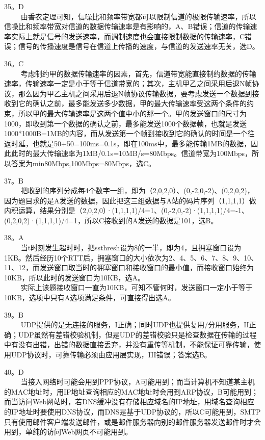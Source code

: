 35。D \\
$\qquad$ 由香农定理可知，信噪比和频率带宽都可以限制信道的极限传输速率，所以信噪比和频率带宽对信道的数据传输速率是有影响的，A、B错误；信道的传输速率实际上就是信号的发送速率，而调制速度也会直接限制数据的传输速率，C错误；信号的传播速度是信号在信道上传播的速度，与信道的发送速率无关，选D。

36。C \\
$\qquad$ 考虑制约甲的数据传输速率的因素，首先，信道带宽能直接制约数据的传输速率，传输速率一定是小于等于信道带宽的；其次，主机甲乙之间采用后退N帧协议，那么因为甲乙主机之间采用后退N帧协议传输数据，要考虑发送一个数据到接收到它的确认之前，最多能发送多少数据，甲的最大传输速率受这两个条件的约束，所以甲的最大传输速率是这两个值中小的那一个。甲的发送窗口的尺寸为1000，即收到第一个数据的确认之前，最多能发送1000个数据帧，也就是发送1000*1000B=1MB的内容，而从发送第一个帧到接收到它的确认的时间是一个往返时延，也就是50+50=100ms=0.1s，即在100ms中，最多能传输1MB的数据，因此此时的最大传输速率为1MB/0.1s=10MB/s=80Mbps。信道带宽为100Mbps，所以答案为min{80Mbps,100Mbps}=80Mbps，选C。

37。B \\
$\qquad$ 把收到的序列分成每4个数字一组，即为（2,0,2,0）、(0,-2,0,-2)、(0,2,0,2)，因为题目求的是A发送的数据，因此把这三组数据与A站的码片序列（1,1,1,1）做内积运算，结果分别是（2,0,2,0）·(1,1,1,1)/4=1、(0,-2,0,-2)·(1,1,1,1)/4=-1、(0,2,0,2)·(1,1,1,1)/4=1，所以C接收到的A发送的数据是101，选B。

38。A \\
$\qquad$ 当t时刻发生超时时，把ssthresh设为8的一半，即为4，且拥塞窗口设为1KB。然后经历10个RTT后，拥塞窗口的大小依次为2、4、5、6、7、8、9、10、11、12，而发送窗口取当时的拥塞窗口和接收窗口的最小值，而接收窗口始终为10KB，所以此时的发送窗口为10KB，选A。 \\
$\qquad$ 实际上该题接收窗口一直为10KB，可知不管何时，发送窗口一定小于等于10KB，选项中只有A选项满足条件，可直接得出选A。


39。B \\
$\qquad$ UDP提供的是无连接的服务，I正确；同时UDP也提供复用/分用服务，II正确；UDP虽然有差错校验机制，但是UDP的差错校验只是检查数据在传输的过程中有没有出错，出错的数据直接丢弃，并没有重传等机制，不能保证可靠传输，使用UDP协议时，可靠传输必须由应用层实现，III错误；答案选B。

40。D \\
$\qquad$ 当接入网络时可能会用到PPP协议，A可能用到；而当计算机不知道某主机的MAC地址时，用IP地址查询相应的MAC地址时会用到ARP协议，B可能用到；而当访问Web网站时，若DNS缓冲没有存储相应域名的IP地址，用域名查询相应的IP地址时要使用DNS协议，而DNS是基于UDP协议的，所以C可能用到，SMTP只有使用邮件客户端发送邮件，或是邮件服务器向别的邮件服务器发送邮件时才会用到，单纯的访问Web网页不可能用到。


